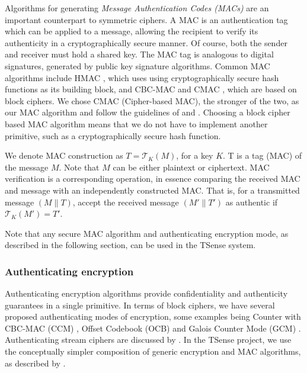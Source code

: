 Algorithms for generating \textit{Message Authentication Codes (MACs)} are an important counterpart to symmetric ciphers. A MAC is an authentication tag which can be applied to a message, allowing the recipient to verify its authenticity in a cryptographically secure manner. Of course, both the sender and receiver must hold a shared key. The MAC tag is analogous to digital signatures, generated by public key signature algorithms. Common MAC algorithms include HMAC , which uses using cryptographically secure hash functions as its building block, and CBC-MAC  and CMAC , which are based on block ciphers. We chose CMAC (Cipher-based MAC), the stronger of the two, as our MAC algorithm and follow the guidelines of  and . Choosing a block cipher based MAC algorithm means that we do not have to implement another primitive, such as a cryptographically secure hash function.

We denote MAC construction as $T=\mathcal{T}_K(M)$, for a key $K$. T is a tag (MAC) of the message $M$. Note that $M$ can be either plaintext or ciphertext.
MAC verification is a corresponding operation, in essence comparing the received MAC and message with an independently constructed MAC. That is, for a transmitted message $(M \parallel T)$, accept the received message $(M' \parallel T')$ as authentic if $\mathcal{T}_K(M') = T'$.

Note that any secure MAC algorithm and authenticating encryption mode, as described in the following section, can be used in the TSense system.

\subsubsection{Authenticating encryption}
\label{sec:authenc}

Authenticating encryption algorithms provide confidentiality and authenticity guarantees in a single primitive. In terms of block ciphers, we have several proposed authenticating modes of encryption, some examples being Counter with CBC-MAC (CCM) , Offset Codebook (OCB)  and Galois Counter Mode (GCM) . Authenticating stream ciphers are discussed by . In the TSense project, we use the conceptually simpler composition of generic encryption and MAC algorithms, as described by .

